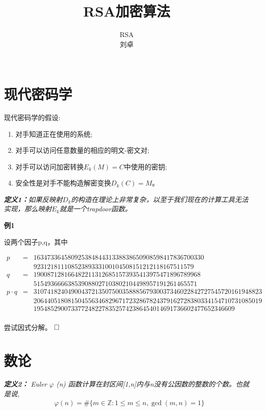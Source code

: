 \documentclass{article}
\date{}
\title{RSA加密算法}
\author{
RSA\\
 刘卓\\
 \texttt{ } \\
}
\begin{document}
\maketitle


\section{现代密码学}

现代密码学的假设:

\begin{enumerate}
\item 对手知道正在使用的系统;
\item 对手可以访问任意数量的相应的明文-密文对;
\item 对手可以访问加密转换$E_k(M) = C$中使用的密钥;
\item 安全性是对手不能构造解密变换$D_k(C) = M$。
\end{enumerate}

\textit{\textbf{定义1：}如果反映射$D_k$的构造在理论上非常复杂，以至于我们现在的计算工具无法实现，那么映射$E_k$就是一个trapdoor函数。}

\textbf{例1}

设两个因子p,q，其中

\begin{eqnarray}   
\label{eq}
p &=& 16347336458092538484431338838650908598417836700330 \nonumber \\ 
&&92312181110852389333100104508151212118167511579 \nonumber \\
q &=& 1900871281664822113126851573935413975471896789968 \nonumber \\ 
&&515493666638539088027103802104498957191261465571 \nonumber \\ 
p \cdot q &=&  3107418240490043721350750035888567930037346022842727545720161948823\nonumber \\ 
&&2064405180815045563468296717232867824379162728380334154710731085019  \nonumber \\ 
&&19548529007337724822783525742386454014691736602477652346609\nonumber \\ 
\nonumber 
\end{eqnarray}

尝试因式分解。
$\hfill\square$ 

\section{数论}

\textit{\textbf{定义2：} Euler $\varphi$ (n) 函数计算在封区间[1,n]内与n没有公因数的整数的个数。也就是说,
$$
\begin{aligned}
&\varphi(n)=\#\{m \in \mathbb{Z}: 1 \leq m \leq n, \operatorname{gcd}(m, n)=1\}\\
\end{aligned}
$$
}
\end{document}
